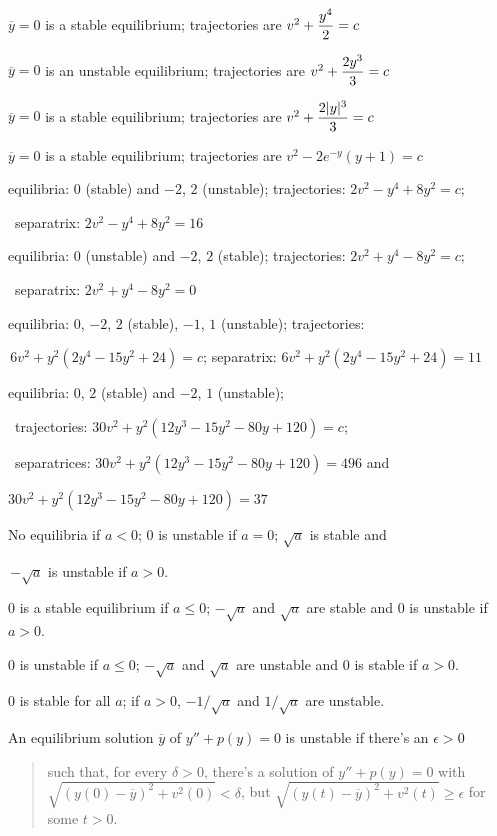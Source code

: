 \medskip

$\overline{y}=0$ is a stable equilibrium;
 trajectories are $v^{2}+\displaystyle\frac{y^{4}}{2}=c$

$\overline{y}=0$ is an unstable equilibrium;
 trajectories are $v^{2}+\displaystyle\frac{2y^{3}}{3}=c$

$\overline{y}=0$ is a stable equilibrium;
 trajectories are $v^{2}+\displaystyle\frac{2|y|^{3}}{3}=c$

$\overline{y}=0$ is a stable equilibrium;
 trajectories are $v^{2}-2e^{-y}(y+1)=c$

equilibria: $0$ (stable) and $-2$, $2$ (unstable);   trajectories:
$2v^{2}-y^{4}+8y^{2}=c$;

\quad \, separatrix: $2v^{2}-y^{4}+8y^{2}=16$

equilibria: $0$ (unstable) and $-2$, $2$ (stable);   trajectories:
$2v^{2}+y^{4}-8y^{2}=c$;

\quad \, separatrix: $2v^{2}+y^{4}-8y^{2}=0$

equilibria: $0$, $-2$, $2$ (stable), $-1$, $1$ (unstable);   trajectories:

\quad \,$6v^{2}+y^{2}(2y^{4}-15y^{2}+24)=c$;   separatrix:
$6v^{2}+y^{2}(2y^{4}-15y^{2}+24)=11$

equilibria: $0$, $2$ (stable) and $-2$, $1$ (unstable);

\quad\,  trajectories:
$30v^{2}+y^{2}(12y^{3}-15y^{2}-80y+120)=c$;

\quad\, separatrices:
$30v^{2}+y^{2}(12y^{3}-15y^{2}-80y+120)=496$ and

\quad\;     $30v^{2}+y^{2}(12y^{3}-15y^{2}-80y+120)=37$

No equilibria if $a<0$;   $0$ is unstable if $a=0$;   $\sqrt{a}$ is stable
and

\quad \,$-\sqrt{a}$ is unstable if $a>0$.

$0$ is a stable equilibrium if $a\le0$;
 $-\sqrt{a}$ and $\sqrt{a}$ are  stable  and $0$
is unstable if $a>0$.

$0$ is unstable if $a\le0$;   $-\sqrt{a}$ and $\sqrt{a}$ are unstable and
$0$ is stable if $a>0$.

$0$ is stable for all $a$; if $a>0$, $-1/\sqrt{a}$ and $1/\sqrt{a}$
are unstable.

An equilibrium solution $\overline{y}$ of
$y''+p(y)=0$ is  unstable
if there's an $\epsilon>0$ \vspace*{-.06in}
\begin{quote}
such that, for every $\delta>0$,
there's a solution of $y''+p(y)=0$ with
$\sqrt{(y(0)-\overline{y})^{2}+v^{2}(0)}<\delta$, but
$\sqrt{(y(t)-\overline{y})^{2}+v^{2}(t)}\ge\epsilon$ for some $t>0$.
\end{quote}

